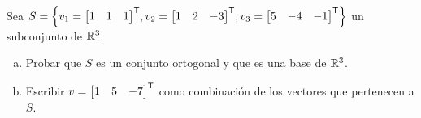 \begin{exercise}
	Sea $S =\set{v_{1} =\mtrans{\begin{bmatrix}
			1 & 1 & 1
	\end{bmatrix}}, v_{2} =\mtrans{\begin{bmatrix}
	1 & 2 & -3
	\end{bmatrix}}, v_{3} =\mtrans{\begin{bmatrix}
	5 & -4 & -1
	\end{bmatrix}}}$ un subconjunto de $\rmath[3]$.
	\begin{enumerate}[a)]
		\item Probar que $S$ es un conjunto ortogonal y que es una base de $\rmath[3]$.
		\item Escribir $v =\mtrans{\begin{bmatrix}
				1 & 5 & -7
		\end{bmatrix}}$ como combinación de los vectores que pertenecen a $S$.
	\end{enumerate}
\end{exercise}

